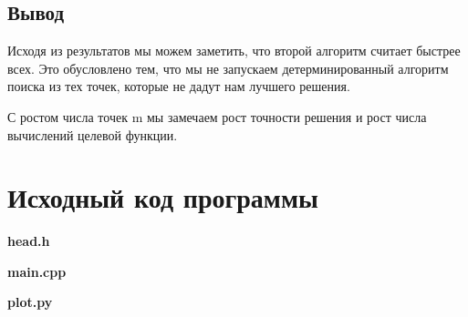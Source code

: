 \documentclass[12pt, a4paper]{article}
\newcommand{\myCodeInput}[3]{
{\bf #2}

}
\begin{document}
\subsection{Вывод}
Исходя из результатов мы можем заметить, что второй алгоритм считает быстрее всех.
Это обусловлено тем, что мы не запускаем детерминированный алгоритм поиска из тех точек, которые не дадут нам лучшего решения.

С ростом числа точек m мы замечаем рост точности решения и рост числа вычислений целевой функции.





\section{Исходный код программы}
\myCodeInput{c++}{head.h}{../head.h}
\myCodeInput{c++}{main.cpp}{../main.cpp}
\myCodeInput{python}{plot.py}{../plot.py}
\end{document}
